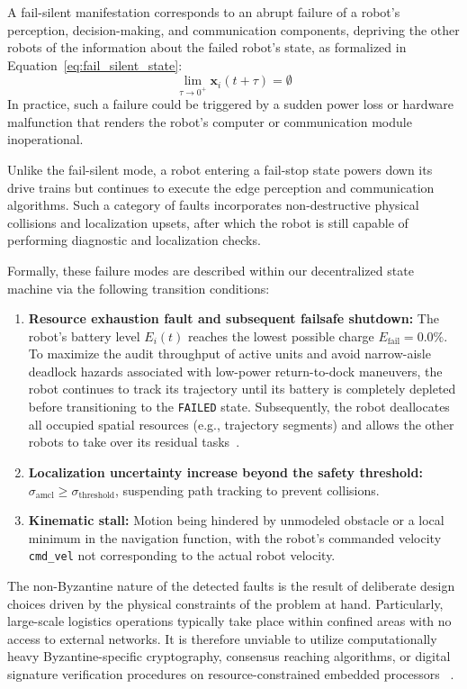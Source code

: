 A fail-silent manifestation corresponds to an abrupt failure of a robot's perception, decision-making, and communication components, depriving the other robots of the information about the failed robot's state, as formalized in Equation~\eqref{eq:fail_silent_state}:
\begin{equation} \lim_{\tau \to 0^+} \mathbf{x}_i(t + \tau) = \emptyset \label{eq:fail_silent_state} \end{equation}
In practice, such a failure could be triggered by a sudden power loss or hardware malfunction that renders the robot's computer or communication module inoperational.

Unlike the fail-silent mode, a robot entering a fail-stop state powers down its drive trains but continues to execute the edge perception and communication algorithms. Such a category of faults incorporates non-destructive physical collisions and localization upsets, after which the robot is still capable of performing diagnostic and localization checks.

Formally, these failure modes are described within our decentralized state machine via the following transition conditions:
\begin{enumerate}
    \item \textbf{Resource exhaustion fault and subsequent failsafe shutdown:} The robot's battery level $E_i(t)$ reaches the lowest possible charge $E_{\text{fail}} = 0.0\%$. To maximize the audit throughput of active units and avoid narrow-aisle deadlock hazards associated with low-power return-to-dock maneuvers, the robot continues to track its trajectory until its battery is completely depleted before transitioning to the \texttt{FAILED} state. Subsequently, the robot deallocates all occupied spatial resources (e.g., trajectory segments) and allows the other robots to take over its residual tasks~\cite{bolu2021adaptive}.
    \item \textbf{Localization uncertainty increase beyond the safety threshold:} $\sigma_{\text{amcl}} \ge \sigma_{\text{threshold}}$, suspending path tracking to prevent collisions.
    \item \textbf{Kinematic stall:} Motion being hindered by unmodeled obstacle or a local minimum in the navigation function, with the robot's commanded velocity \texttt{cmd\_vel} not corresponding to the actual robot velocity.
\end{enumerate}

The non-Byzantine nature of the detected faults is the result of deliberate design choices driven by the physical constraints of the problem at hand. Particularly, large-scale logistics operations typically take place within confined areas with no access to external networks. It is therefore unviable to utilize computationally heavy Byzantine-specific cryptography, consensus reaching algorithms, or digital signature verification procedures on resource-constrained embedded processors ~\cite{strobel2020blockchain, roth2021byzantine}.

